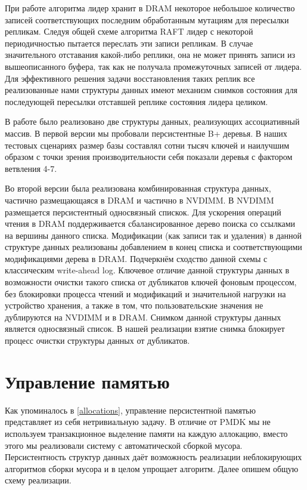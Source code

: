 \documentclass[pdftex,ptm,12pt,a4paper]{report}
\theoremstyle{definition}
\begin{document}
При работе алгоритма лидер хранит в DRAM некоторое небольшое количество записей соответствующих последним обработанным мутациям для пересылки репликам.
Следуя общей схеме алгоритма RAFT лидер с некоторой периодичностью пытается переслать эти записи репликам. В случае значительного отставания какой-либо реплики, она не может
принять записи из вышеописанного буфера, так как не получала промежуточных записей от лидера. Для эффективного решения задачи восстановления таких реплик все реализованные нами
структуры данных имеют механизм снимков состояния для последующей пересылки отставшей реплике состояния лидера целиком.

В работе было реализовано две структуры данных, реализующих ассоциативный массив. В первой версии мы пробовали персистентные B+ деревья.
В наших тестовых сценариях размер базы составлял сотни тысяч ключей и наилучшим образом с точки зрения производительности себя показали деревья с фактором ветвления 4-7.

Во второй версии была реализована комбинированная структура данных, частично размещающаяся в DRAM и частично в NVDIMM. В NVDIMM размещается персистентный односвязный спискок.
Для ускорения операций чтения в DRAM поддерживается сбалансированное дерево поиска со ссылками на вершины данного списка.
Модификации (как записи так и удаления) в данной структуре данных реализованы добавлением в конец списка и соответствующими модификациями дерева в DRAM.
Подчеркнём сходство данной схемы с классическим write-ahead log. Ключевое отличие данной структуры данных в возможности очистки такого списка от дубликатов ключей фоновым
процессом, без блокировки процесса чтений и модификаций и значительной нагрузки на устройство хранения,  а также в том, что пользовательские значения не дублируются
на NVDIMM и в DRAM.
Снимком данной структуры данных является односвязный список.
В нашей реализации взятие снимка блокирует процесс очистки структуры данных от дубликатов.

\section{Управление памятью}
\label{gc}
Как упоминалось в \ref{allocations}, управление персистентной памятью представляет из себя нетривиальную задачу.
В отличие от PMDK мы не используем транзакционное выделение памяти на каждую аллокацию, вместо этого мы реализовали систему с автоматической сборкой мусора.
Персистентность структур данных даёт возможность реализации неблокирующих алгоритмов сборки мусора и в целом упрощает алгоритм.
Далее опишем общую схему реализации. 
\end{document}
